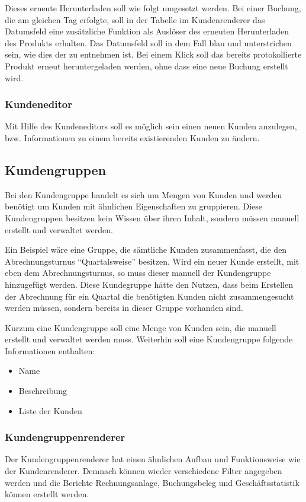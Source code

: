 Dieses erneute Herunterladen soll wie folgt umgesetzt werden. Bei einer Buchung, die am gleichen Tag erfolgte, soll in der Tabelle im Kundenrenderer das Datumsfeld eine zusätzliche Funktion als Auslöser des  erneuten Herunterladen des Produkts erhalten.
Das Datumsfeld soll in dem Fall blau und unterstrichen sein, wie dies der  zu entnehmen ist.
Bei einem Klick soll das bereits protokollierte Produkt erneut heruntergeladen werden, ohne dass eine neue Buchung erstellt wird.

\subsubsection{Kundeneditor}
Mit Hilfe des Kundeneditors soll es möglich sein einen neuen Kunden anzulegen, bzw. Informationen zu einem bereits existierenden Kunden zu ändern.

\subsection{Kundengruppen}
Bei den Kundengruppe handelt es sich um Mengen von Kunden und werden benötigt um Kunden mit ähnlichen Eigenschaften zu gruppieren.
Diese Kundengruppen besitzen kein Wissen über ihren Inhalt, sondern müssen manuell erstellt und verwaltet werden.

Ein Beispiel wäre eine Gruppe, die sämtliche Kunden zusammenfasst, die den Abrechnungsturnus "`Quartalsweise"' besitzen. Wird ein neuer Kunde erstellt, mit eben dem Abrechnungsturnus, so muss dieser manuell der Kundengruppe hinzugefügt werden.
Diese Kundegruppe hätte den Nutzen, dass beim Erstellen der Abrechnung für ein Quartal die benötigten Kunden nicht zusammengesucht werden müssen, sondern bereits in dieser Gruppe vorhanden sind.

Kurzum eine Kundengruppe soll eine Menge von Kunden sein, die manuell erstellt und verwaltet werden muss. Weiterhin soll eine Kundengruppe folgende Informationen enthalten:
\begin{itemize}
\item Name
\item Beschreibung
\item Liste der Kunden
\end{itemize}
 
\subsubsection{Kundengruppenrenderer}
Der Kundengruppenrenderer hat einen ähnlichen Aufbau und Funktionsweise wie der Kundenrenderer.
Demnach können wieder verschiedene Filter angegeben werden  und die Berichte Rechnungsanlage, Buchungsbeleg und Geschäftsstatistik können erstellt werden.


